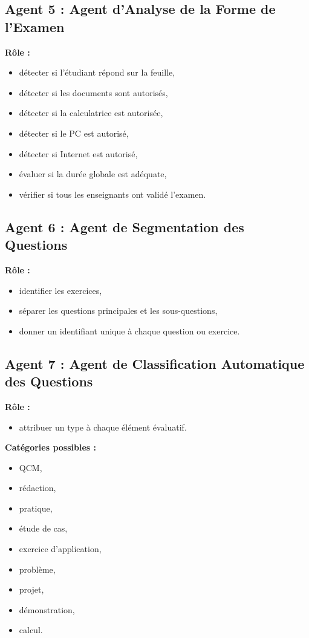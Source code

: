 \documentclass[12pt,a4paper]{article}
\begin{document}
\subsection*{Agent 5 : Agent d’Analyse de la Forme de l’Examen}

\textbf{Rôle :}
\begin{itemize}[leftmargin=1cm]
    \item détecter si l’étudiant répond sur la feuille,
    \item détecter si les documents sont autorisés,
    \item détecter si la calculatrice est autorisée,
    \item détecter si le PC est autorisé,
    \item détecter si Internet est autorisé,
    \item évaluer si la durée globale est adéquate,
    \item vérifier si tous les enseignants ont validé l’examen.
\end{itemize}

\subsection*{Agent 6 : Agent de Segmentation des Questions}

\textbf{Rôle :}
\begin{itemize}[leftmargin=1cm]
    \item identifier les exercices,
    \item séparer les questions principales et les sous-questions,
    \item donner un identifiant unique à chaque question ou exercice.
\end{itemize}

\subsection*{Agent 7 : Agent de Classification Automatique des Questions}

\textbf{Rôle :}
\begin{itemize}[leftmargin=1cm]
    \item attribuer un type à chaque élément évaluatif.
\end{itemize}

\textbf{Catégories possibles :}
\begin{itemize}[leftmargin=1cm]
    \item QCM,
    \item rédaction,
    \item pratique,
    \item étude de cas,
    \item exercice d’application,
    \item problème,
    \item projet,
    \item démonstration,
    \item calcul.
\end{itemize}
\end{document}
